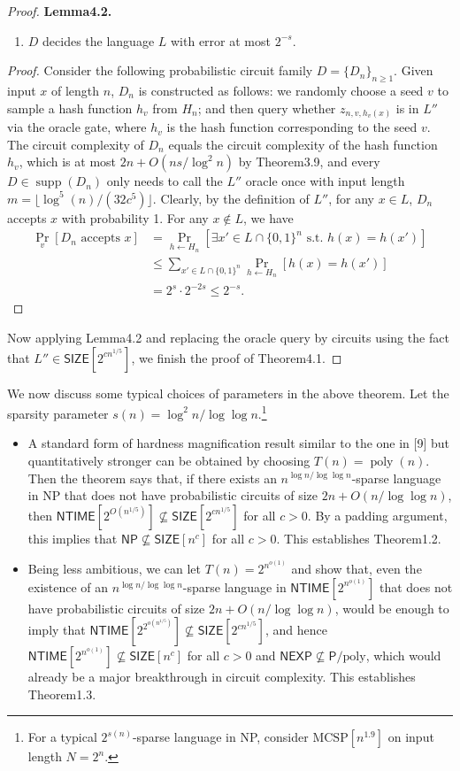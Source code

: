 \documentclass[10pt,a4paper]{article}
\newenvironment{authorclaim}[1]{\par\medskip\noindent\textbf{#1.}\ }{\par\medskip}
\begin{document}
\begin{proof}
\begin{authorclaim}{Lemma4.2}
\begin{enumerate}
\item $D$ decides the language $L$ with error at most $2^{-s}$.
\end{enumerate}
\end{authorclaim}
\begin{proof}
Consider the following probabilistic circuit family $D=\{D_n\}_{n\ge1}$. Given input $x$ of length $n$, $D_n$ is constructed as follows: we randomly choose a seed $v$ to sample a hash function $h_v$ from $H_n$; and then query whether $z_{n,v,h_v(x)}$ is in $L''$ via the oracle gate, where $h_v$ is the hash function corresponding to the seed $v$. The circuit complexity of $D_n$ equals the circuit complexity of the hash function $h_v$, which is at most $2n+O(ns/\log^2n)$ by Theorem3.9, and every $D\in\operatorname{supp}(D_n)$ only needs to call the $L''$ oracle once with input length $m=\lfloor\log^5(n)/(32c^5)\rfloor$. Clearly, by the definition of $L''$, for any $x\in L$, $D_n$ accepts $x$ with probability 1. For any $x\notin L$, we have
\begin{align*}
\Pr_v[D_n\text{ accepts }x]
&=\Pr_{h\leftarrow H_n}[\exists x'\in L\cap\{0,1\}^n\text{ s.t. }h(x)=h(x')]\\
&\le\sum_{x'\in L\cap\{0,1\}^n}\Pr_{h\leftarrow H_n}[h(x)=h(x')]\\
&=2^s\cdot2^{-2s}\le2^{-s}.
\end{align*}
\end{proof}
Now applying Lemma4.2 and replacing the oracle query by circuits using the fact that $L''\in\mathsf{SIZE}[2^{cn^{1/5}}]$, we finish the proof of Theorem4.1.
\end{proof}
We now discuss some typical choices of parameters in the above theorem. Let the sparsity parameter $s(n)=\log^2n/\log\log n$.\footnote{For a typical $2^{s(n)}$-sparse language in NP, consider $\mathrm{MCSP}[n^{1.9}]$ on input length $N=2^n$.}
\begin{itemize}
\item A standard form of hardness magnification result similar to the one in [9] but quantitatively stronger can be obtained by choosing $T(n)=\operatorname{poly}(n)$. Then the theorem says that, if there exists an $n^{\log n/\log\log n}$-sparse language in NP that does not have probabilistic circuits of size $2n+O(n/\log\log n)$, then $\mathsf{NTIME}[2^{O(n^{1/5})}]\not\subseteq\mathsf{SIZE}[2^{cn^{1/5}}]$ for all $c>0$. By a padding argument, this implies that $\mathsf{NP}\not\subseteq\mathsf{SIZE}[n^c]$ for all $c>0$. This establishes Theorem1.2.
\item Being less ambitious, we can let $T(n)=2^{n^{o(1)}}$ and show that, even the existence of an $n^{\log n/\log\log n}$-sparse language in $\mathsf{NTIME}[2^{n^{o(1)}}]$ that does not have probabilistic circuits of size $2n+O(n/\log\log n)$, would be enough to imply that $\mathsf{NTIME}[2^{2^{o(n^{1/5})}}]\not\subseteq\mathsf{SIZE}[2^{cn^{1/5}}]$, and hence $\mathsf{NTIME}[2^{n^{o(1)}}]\not\subseteq\mathsf{SIZE}[n^c]$ for all $c>0$ and $\mathsf{NEXP}\not\subseteq\mathsf P/\mathrm{poly}$, which would already be a major breakthrough in circuit complexity. This establishes Theorem1.3.
\end{itemize}
\end{document}
